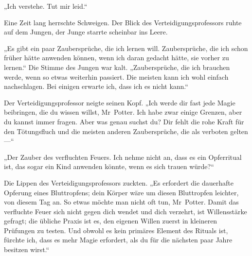 „Ich verstehe. Tut mir leid.“

Eine Zeit lang herrschte Schweigen. Der Blick des Verteidigungsprofessors ruhte auf dem Jungen, der Junge starrte scheinbar ins Leere.

„Es gibt ein paar Zaubersprüche, die ich lernen will. Zaubersprüche, die ich schon früher hätte anwenden können, wenn ich daran gedacht hätte, sie vorher zu lernen.“ Die Stimme des Jungen war kalt.
„Zaubersprüche, die ich brauchen werde, wenn so etwas weiterhin passiert. Die meisten kann ich wohl einfach nachschlagen. Bei einigen erwarte ich, dass ich es nicht kann.“

Der Verteidigungsprofessor neigte seinen Kopf.
„Ich werde dir fast jede Magie beibringen, die du wissen willst, Mr~Potter. Ich habe zwar einige Grenzen, aber du kannst immer fragen. Aber was genau suchst du? Dir fehlt die rohe Kraft für den Tötungsfluch und die meisten anderen Zaubersprüche, die als verboten gelten —“

„Der Zauber des verfluchten Feuers. Ich nehme nicht an, dass es ein Opferritual ist, das sogar ein Kind anwenden könnte, wenn es sich trauen würde?“

Die Lippen des Verteidigungsprofessors zuckten.
„Es erfordert die dauerhafte Opferung eines Bluttropfens; dein Körper wäre um diesen Bluttropfen leichter, von diesem Tag an. So etwas möchte man nicht oft tun, Mr~Potter. Damit das verfluchte Feuer sich nicht gegen dich wendet und dich verzehrt, ist Willensstärke gefragt; die übliche Praxis ist es, den eigenen Willen zuerst in kleineren Prüfungen zu testen. Und obwohl es kein primäres Element des Rituals ist, fürchte ich, dass es mehr Magie erfordert, als du für die nächsten paar Jahre besitzen wirst.“

